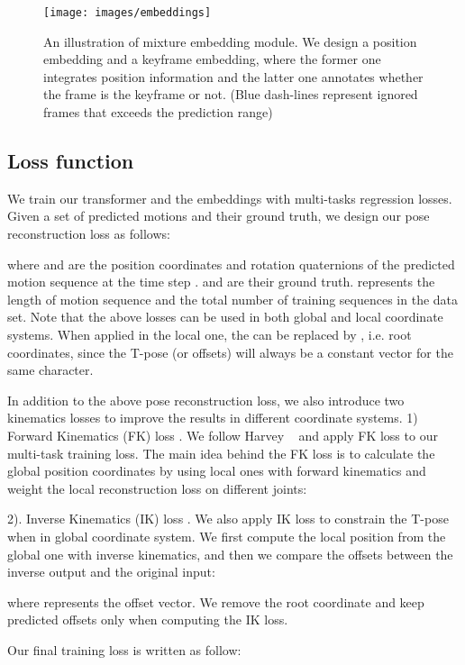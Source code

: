 \documentclass[10pt,twocolumn,letterpaper]{article}
\begin{document}
\begin{figure}[t]
  \centering
  \texttt{[image: images/embeddings]}
  \caption{An illustration of mixture embedding module. We design a position embedding and a keyframe embedding, where the former one integrates position information and the latter one annotates whether the frame is the keyframe or not. (Blue dash-lines represent ignored frames that exceeds the prediction range)}
  \label{fig:embeddings}
\end{figure}


\subsection{Loss function}

We train our transformer and the embeddings with multi-tasks regression losses. Given a set of predicted motions and their ground truth, we design our pose reconstruction loss  as follows:

where  and  are the position coordinates and rotation quaternions of the predicted motion sequence  at the time step .  and   are their ground truth.  represents the length of motion sequence and the total number of training sequences in the data set. Note that the above losses can be used in both global and local coordinate systems. When applied in the local one, the  can be replaced by , i.e. root coordinates, since the T-pose (or offsets) will always be a constant vector for the same character.

In addition to the above pose reconstruction loss, we also introduce two  kinematics losses to improve the results in different coordinate systems. 1) Forward Kinematics (FK) loss . We follow Harvey \etal~\cite{harvey2020robust} and apply FK loss to our multi-task training loss. The main idea behind the FK loss is to calculate the global position coordinates by using local ones with forward kinematics and weight the local reconstruction loss on different joints:

2). Inverse Kinematics (IK) loss . We also apply IK loss to constrain the T-pose when in global coordinate system. We first compute the local position from the global one with inverse kinematics, and then we compare the offsets between the inverse output and the original input:

where  represents the offset vector. We remove the root coordinate and keep predicted offsets only when computing the IK loss.

Our final training loss is written as follow:
\end{document}
